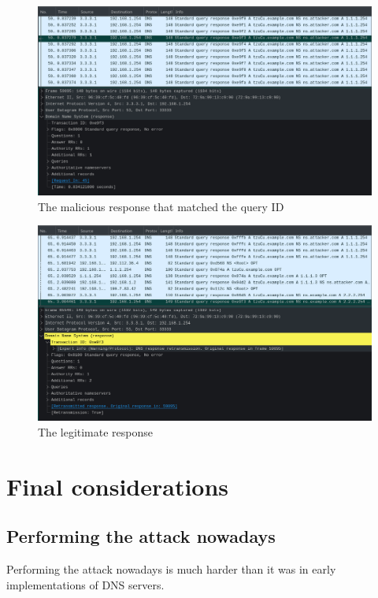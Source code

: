 \documentclass[11pt,a4paper]{article}
\begin{document}
\begin{figure}[h!]
  \includegraphics[width=\linewidth]{wireshark-2.png}
  \caption{The malicious response that matched the query ID}
  \label{fig:wireshark-2}
\end{figure}

\begin{figure}[h!]
  \includegraphics[width=\linewidth]{wireshark-3.png}
  \caption{The legitimate response}
  \label{fig:wireshark-3}
\end{figure}

\clearpage

\section{Final considerations}
\label{sec:final-considerations}

\subsection{Performing the attack nowadays}

Performing the attack nowadays is much harder than it was in early implementations of DNS servers. 
\end{document}
